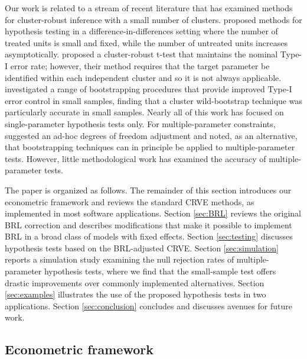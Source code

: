 \documentclass[12pt]{article}\usepackage[]{graphicx}\usepackage[]{color}
\begin{document}
Our work is related to a stream of recent literature that has examined methods for cluster-robust inference with a small number of clusters. 
\citet{Conley2011inference} proposed methods for hypothesis testing in a difference-in-differences setting where the number of treated units is small and fixed, while the number of untreated units increases asymptotically. 
\citet{Ibragimov2010tstatistic} proposed a cluster-robust t-test that maintains the nominal Type-I error rate; however, their method requires that the target parameter be identified within each independent cluster and so it is not always applicable.  
\citet{Cameron2008bootstrap} investigated a range of bootstrapping procedures that provide improved Type-I error control in small samples, finding that a cluster wild-bootstrap technique was particularly accurate in small samples. 
Nearly all of this work has focused on single-parameter hypothesis tests only. 
For multiple-parameter constraints, \citet{Cameron2015practitioners} suggested an ad-hoc degrees of freedom adjustment and noted, as an alternative, that bootstrapping techniques can in principle be applied to multiple-parameter tests. 
However, little methodological work has examined the accuracy of multiple-parameter tests.

The paper is organized as follows. The remainder of this section introduces our econometric framework and reviews the standard CRVE methods, as implemented in most software applications.
Section \ref{sec:BRL} reviews the original BRL correction and describes modifications that make it possible to implement BRL in a broad class of models with fixed effects.
Section \ref{sec:testing} discusses hypothesis tests based on the BRL-adjusted CRVE. 
Section \ref{sec:simulation} reports a simulation study examining the null rejection rates of multiple-parameter hypothesis tests, where we find that the small-sample test offers drastic improvements over commonly implemented alternatives. 
Section \ref{sec:examples} illustrates the use of the proposed hypothesis tests in two applications. 
Section \ref{sec:conclusion} concludes and discusses avenues for future work. 

\subsection{Econometric framework}
\end{document}
